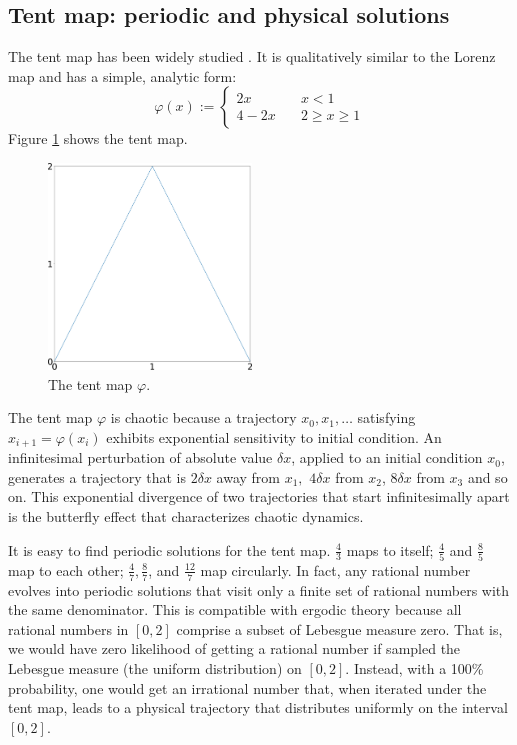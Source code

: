 \subsection{Tent map: periodic and physical solutions}
\label{sec:tent}
The tent map has been widely studied \cite{tent1}\cite{tent2}.  It is qualitatively similar
to the Lorenz map and has a simple, analytic form:
\begin{equation} \label{tentmap}
    \varphi(x) := \begin{cases}
    2x \quad & x < 1 \\
    4 - 2x \quad & 2 \ge x \ge 1
    \end{cases}
\end{equation}
Figure \ref{fig:tent_map} shows the tent map.
\begin{figure}\centering
\includegraphics[width=0.48\textwidth]{figure/tent_map.png}
\caption{The tent map $\varphi$.}
\label{fig:tent_map}
\end{figure}

The tent map $\varphi$ is chaotic because a trajectory $x_0,x_1,\ldots$ satisfying
$x_{i+1} = \varphi(x_i)$ exhibits exponential sensitivity to initial condition. An infinitesimal perturbation of absolute value $\delta x$, applied to an initial condition $x_0$, generates a trajectory that is $2 \delta x$ away from $x_1,$ $4 \delta x$ from $x_2$, $8 \delta x$ from $x_3$ and so on. This exponential divergence of two trajectories that start infinitesimally apart is the butterfly effect that characterizes
chaotic dynamics.

It is easy to find periodic solutions for the tent map.
$\frac43$ maps to itself; $\frac45$ and $\frac85$ map to each other;
$\frac47, \frac87$, and $\frac{12}7$ map circularly.  In fact, any rational number evolves into periodic solutions that visit
only a finite set of rational numbers with the same denominator.
This is compatible
with ergodic theory because all rational numbers in $[0,2]$ comprise a subset of Lebesgue measure zero. That is, we would have zero likelihood of getting a
rational number if sampled the Lebesgue measure (the uniform distribution) on $[0,2]$.  Instead, with a 100\% probability, one would get an irrational number
that, when iterated under the tent map, leads to a physical trajectory that distributes uniformly on the interval $[0,2]$.

